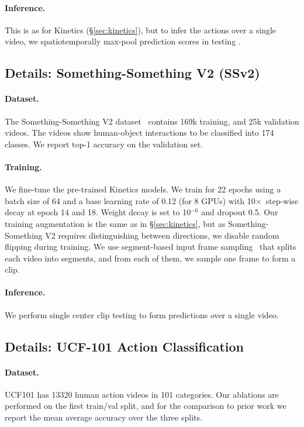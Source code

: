 \documentclass[final]{cvpr}
\def\x{$\times$}
\begin{document}
\paragraph{Inference.} 
This is as for Kinetics (\S\ref{sec:kinetics}), but to infer the actions over a single video, we spatiotemporally max-pool prediction scores in testing \cite{Feichtenhofer19}. 


\subsection{Details: Something-Something V2 (SSv2)}\label{sec:ssv2}

\paragraph{Dataset.}
The Something-Something V2 dataset~\cite{ssv2} contains 169k training, and 25k validation videos.
The videos show human-object interactions to be classified into 174 classes.
We report top-1 accuracy on the validation set. 


\paragraph{Training.}
We fine-tune the pre-trained Kinetics models. We train for 22 epochs using a batch size of 64 and a base learning rate of 0.12 (for 8 GPUs) with 10\x~step-wise decay at epoch 14 and 18. Weight decay is set to 10$^{-6}$ and dropout 0.5. Our training augmentation is the same as in \S\ref{sec:kinetics}, but as Something-Something V2 requires distinguishing between directions, we disable random flipping during training.
We use segment-based input frame sampling~\cite{lin2018temporal} that splits each video into segments, and from each of them, we sample one frame to form a clip.

\paragraph{Inference.} We perform single center clip testing to form predictions over a single video.

\subsection{Details: UCF-101 Action Classification}\label{sec:ucf}

\paragraph{Dataset.}
UCF101 \cite{Soomro12} has 13320 human action videos in 101 categories. 
Our ablations are performed on the first train/val split, and for the comparison to prior work we report the mean average accuracy over the three splits. 
\end{document}

